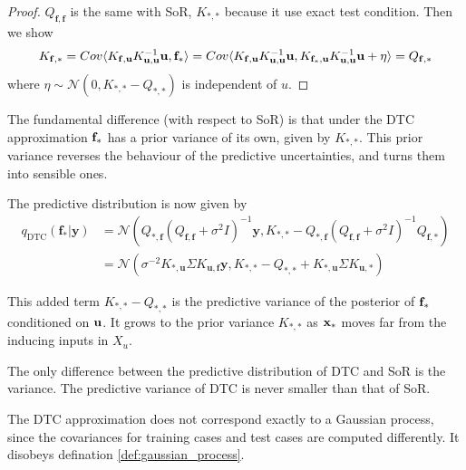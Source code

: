 \documentclass[10pt]{elegantbook}
\begin{document}
\begin{proof}
    $Q_{\mathbf f, \mathbf f}$ is the same with SoR, $K_{*, *}$ because it use exact test condition. Then we show
    \[
        K_{\mathbf f, *} = Cov \langle K_{\mathbf{f,u}}K_{\mathbf{u,u}}^{-1}{\bf u}, \mathbf f_* \rangle 
        = Cov \langle K_{\mathbf{f,u}}K_{\mathbf{u,u}}^{-1}{\bf u}, K_{\mathbf{f_*,u}}K_{\mathbf{u,u}}^{-1} \mathbf u + \eta \rangle 
        = Q_{\mathbf{f,*}}
    \]
    where $\eta \sim \mathcal N(0, K_{*, *} - Q_{*, *})$ is independent of $u$.
\end{proof}

The fundamental difference (with respect to SoR) is that under the DTC approximation $\bf f_*$ has a prior variance of its own,
given by $K_{*, *}$. This prior variance reverses the behaviour of the predictive uncertainties, and turns
them into sensible ones.

The predictive distribution is now given by
\begin{equation}
    \begin{aligned}
    q_{\text{DTC}}(\mathbf f_* | \mathbf y) &= \mathcal N \left (
        Q_{*, \mathbf f} (Q_{\mathbf f, \mathbf f} + \sigma^2 I)^{-1} \mathbf y,
        K_{*, *} - Q_{*, \mathbf f} (Q_{\mathbf f, \mathbf f} + \sigma^2 I)^{-1} Q_{\mathbf f, *}
        \right ) \\
        &= \mathcal N \left (
            \sigma^{-2} K_{*, \mathbf u} \Sigma K_{\mathbf u, \mathbf f} \mathbf y,
            K_{*, *} - Q_{*, *} + K_{*, \mathbf u} \Sigma K_{\mathbf u, *}
            \right )
    \end{aligned}
\end{equation}

This added term $K_{*, *} - Q_{*, *}$ is the
predictive variance of the posterior of $\bf f_*$ conditioned on $\bf u$. It grows to the prior variance $K_{*, *}$ as $\bf x_*$
moves far from the inducing inputs in $X_u$.

\begin{remark}
    The only difference between the predictive distribution of DTC and SoR is the variance.
The predictive variance of DTC is never smaller than that of SoR.
\end{remark}

\begin{remark}
    The DTC approximation does not correspond exactly to a Gaussian process, since the covariances for training cases and test cases are computed differently.
    It disobeys defination \ref{def:gaussian_process}.
\end{remark}
\end{document}
